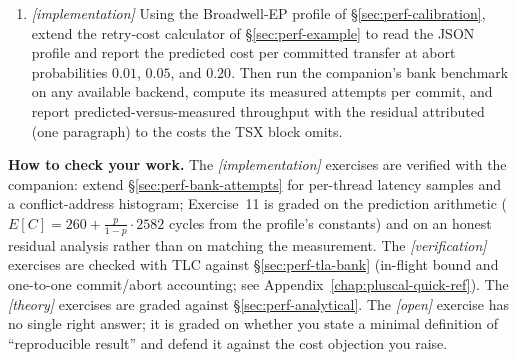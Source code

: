 \begin{enumerate}
          for TM systems research, or would that raise the bar so high that
          exploratory and negative results stop being published at all?
          State what you think a ``reproducible result'' minimally requires.
    \item \emph{[implementation]} Using the Broadwell-EP profile of
          \S\ref{sec:perf-calibration}, extend the retry-cost calculator of
          \S\ref{sec:perf-example} to read the JSON profile and report the
          predicted cost per committed transfer at abort probabilities
          $0.01$, $0.05$, and $0.20$. Then run the companion's bank benchmark
          on any available backend, compute its measured attempts per commit,
          and report predicted-versus-measured throughput with the residual
          attributed (one paragraph) to the costs the TSX block omits.
\end{enumerate}

\textbf{How to check your work.} The \emph{[implementation]} exercises are
verified with the companion: extend \S\ref{sec:perf-bank-attempts} for
per-thread latency samples and a conflict-address histogram; Exercise~11 is
graded on the prediction arithmetic
($E[C] = 260 + \frac{p}{1-p}\cdot 2582$ cycles from the profile's constants)
and on an honest residual analysis rather than on matching the measurement.
The
\emph{[verification]} exercises are checked with TLC against
\S\ref{sec:perf-tla-bank} (in-flight bound and one-to-one commit/abort
accounting; see Appendix~\ref{chap:pluscal-quick-ref}).  The
\emph{[theory]} exercises are graded against \S\ref{sec:perf-analytical}.
The \emph{[open]} exercise has no single right answer; it is graded on
whether you state a minimal definition of ``reproducible result'' and
defend it against the cost objection you raise.

